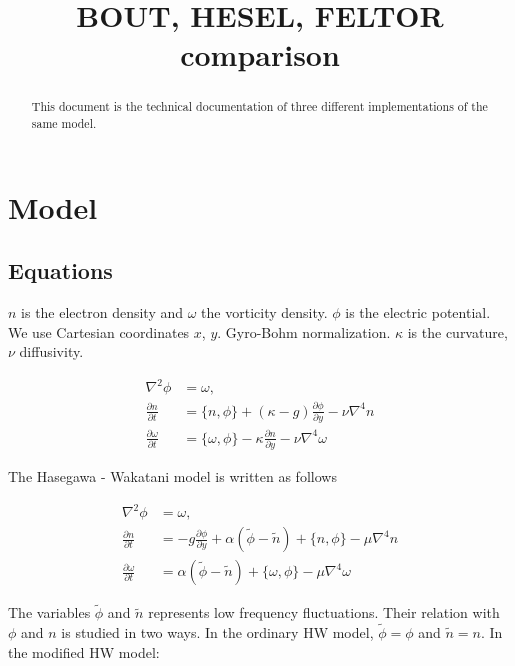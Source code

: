 \documentclass{hitec} %
\begin{document}
\title{BOUT, HESEL, FELTOR comparison}
\maketitle

\begin{abstract}
This document is the technical documentation of three different implementations of the same model.
\end{abstract}

\section{Model}
\subsection{Equations}
 $n$ is the electron density and $\omega$
the vorticity density. $\phi$ is the electric potential. We
use Cartesian coordinates $x$, $y$. Gyro-Bohm normalization. $\kappa$ is
the curvature, $\nu$ diffusivity.

\begin{subequations}
\begin{align}
 \nabla^2 \phi & =  \omega, \quad \\
 \frac{\partial n}{\partial t}    & =
    \{ n, \phi\}
  + (\kappa - g) \frac{\partial \phi}{\partial y}
  - \nu \nabla^4 n  \\  
  \frac{\partial \omega}{\partial t} & =
  \{ \omega, \phi\}
  - \kappa\frac{\partial n}{\partial y} -\nu\nabla^4\omega
\end{align}
\end{subequations}

The Hasegawa - Wakatani model is written as follows

\begin{subequations}
\begin{align}
 \nabla^2 \phi & =  \omega, \quad \\
 \frac{\partial n}{\partial t}     & =  - g \frac{\partial \phi}{\partial y} + \alpha (\tilde{\phi} - \tilde{n})
 + \{n, \phi\} - \mu \nabla^4 n \\
  \frac{\partial \omega}{\partial t} & =  \alpha ( \tilde{\phi} - \tilde{n}) + \{ \omega, \phi\}
- \mu\nabla^4\omega
\end{align}
\end{subequations}

The variables $\tilde{\phi}$ and $\tilde{n}$ represents low frequency fluctuations. Their relation with $\phi$ and $n$ is studied in two ways. In the ordinary HW model, $\tilde{\phi} = \phi$ and $\tilde{n} = n$. In the modified HW model: 
\end{document}
